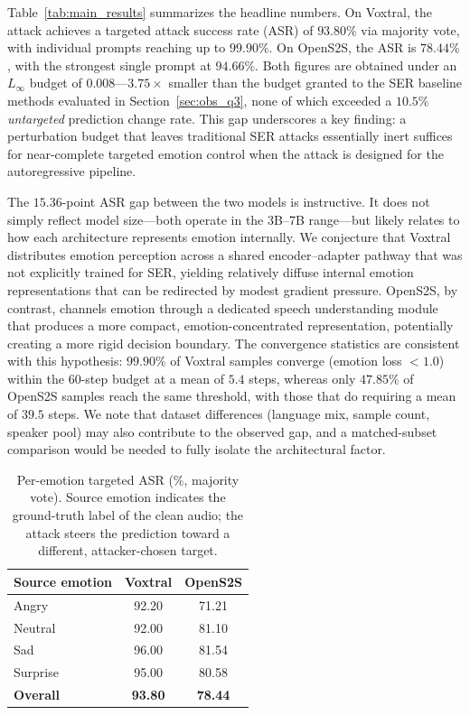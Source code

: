 Table~\ref{tab:main_results} summarizes the headline numbers.
On Voxtral, the attack achieves a targeted attack success rate (ASR) of $\mathbf{93.80\%}$ via majority vote, with individual prompts reaching up to $99.90\%$.
On OpenS2S, the ASR is $\mathbf{78.44\%}$, with the strongest single prompt at $94.66\%$.
Both figures are obtained under an $L_\infty$ budget of $0.008$---$3.75\times$ smaller than the budget granted to the SER baseline methods evaluated in Section~\ref{sec:obs_q3}, none of which exceeded a $10.5\%$ \textit{untargeted} prediction change rate.
This gap underscores a key finding: a perturbation budget that leaves traditional SER attacks essentially inert suffices for near-complete targeted emotion control when the attack is designed for the autoregressive pipeline.

The $15.36$-point ASR gap between the two models is instructive.
It does not simply reflect model size---both operate in the 3B--7B range---but likely relates to how each architecture represents emotion internally.
We conjecture that Voxtral distributes emotion perception across a shared encoder--adapter pathway that was not explicitly trained for SER, yielding relatively diffuse internal emotion representations that can be redirected by modest gradient pressure.
OpenS2S, by contrast, channels emotion through a dedicated speech understanding module that produces a more compact, emotion-concentrated representation, potentially creating a more rigid decision boundary.
The convergence statistics are consistent with this hypothesis: $99.90\%$ of Voxtral samples converge (emotion loss $< 1.0$) within the 60-step budget at a mean of $5.4$ steps, whereas only $47.85\%$ of OpenS2S samples reach the same threshold, with those that do requiring a mean of $39.5$ steps.
We note that dataset differences (language mix, sample count, speaker pool) may also contribute to the observed gap, and a matched-subset comparison would be needed to fully isolate the architectural factor.


\begin{table}[!t]
\centering
\small
\caption{Per-emotion targeted ASR (\%, majority vote).
Source emotion indicates the ground-truth label of the clean audio; the attack steers the prediction toward a different, attacker-chosen target.}
\label{tab:per_emotion_asr}
\setlength{\tabcolsep}{10pt}
\begin{tabular}{l c c}
\toprule
\textbf{Source emotion} & \textbf{Voxtral} & \textbf{OpenS2S} \\
\midrule
Angry    & 92.20 & 71.21 \\
Neutral  & 92.00 & 81.10 \\
Sad      & 96.00 & 81.54 \\
Surprise & 95.00 & 80.58 \\
\midrule
\textbf{Overall} & \textbf{93.80} & \textbf{78.44} \\
\bottomrule
\end{tabular}
\end{table}

